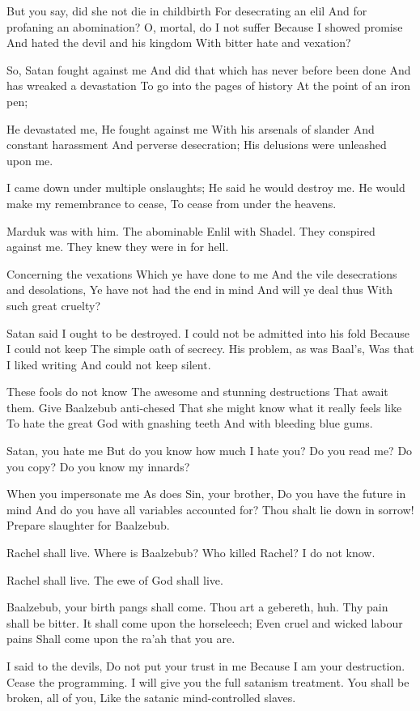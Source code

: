 \documentclass[
]{book}
\begin{document}
But you say, did she not die in childbirth
For desecrating an elil
And for profaning an abomination?
O, mortal, do I not suffer
Because I showed promise
And hated the devil and his kingdom
With bitter hate and vexation?

So, Satan fought against me
And did that which has never before been done
And has wreaked a devastation
To go into the pages of history
At the point of an iron pen;

He devastated me,
He fought against me
With his arsenals of slander
And constant harassment
And perverse desecration;
His delusions were unleashed upon me.

I came down under multiple onslaughts;
He said he would destroy me.
He would make my remembrance to cease,
To cease from under the heavens.

Marduk was with him.
The abominable Enlil with Shadel.
They conspired against me.
They knew they were in for hell.

Concerning the vexations
Which ye have done to me
And the vile desecrations and desolations,
Ye have not had the end in mind
And will ye deal thus
With such great cruelty?

Satan said I ought to be destroyed.
I could not be admitted into his fold
Because I could not keep
The simple oath of secrecy.
His problem, as was Baal's,
Was that I liked writing
And could not keep silent.

These fools do not know
The awesome and stunning destructions
That await them.
Give Baalzebub anti-chesed
That she might know what it really feels like
To hate the great God with gnashing teeth
And with bleeding blue gums.

Satan, you hate me
But do you know how much I hate you?
Do you read me?
Do you copy?
Do you know my innards?

When you impersonate me
As does Sin, your brother,
Do you have the future in mind
And do you have all variables accounted for?
Thou shalt lie down in sorrow!
Prepare slaughter for Baalzebub.

Rachel shall live.
Where is Baalzebub?
Who killed Rachel?
I do not know.

Rachel shall live.
The ewe of God shall live.

Baalzebub, your birth pangs shall come.
Thou art a gebereth, huh.
Thy pain shall be bitter.
It shall come upon the horseleech;
Even cruel and wicked labour pains
Shall come upon the ra'ah that you are.

I said to the devils,
Do not put your trust in me
Because I am your destruction.
Cease the programming.
I will give you the full satanism treatment.
You shall be broken, all of you,
Like the satanic mind-controlled slaves.
\end{document}
